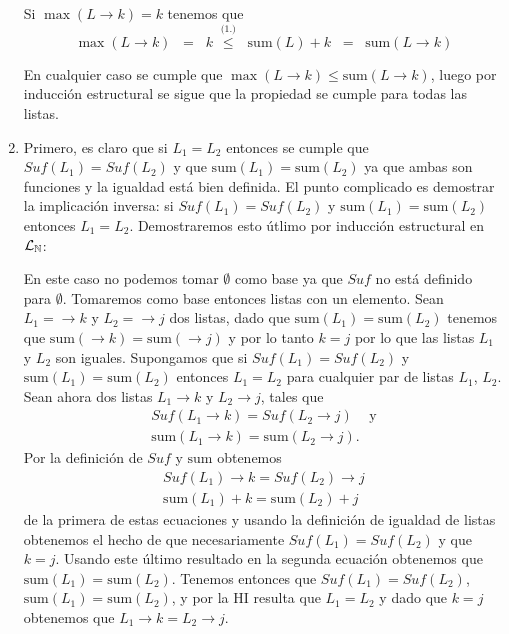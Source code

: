 \begin{teorema}
\begin{demostracion}
\begin{enumerate}
\begin{inducciondemo}
		Si $\max(L\rightarrow k)=k$ tenemos que
		  \[
		  \max(L\rightarrow k)\;\;=\;\;k\;\stackrel{\text{(1.)}}{\leq}\;\;\text{sum}(L) + k\;\;=\;\;\text{sum}(L\rightarrow k)
		  \]
		
		En cualquier caso se cumple que $\max(L\rightarrow k)\leq\text{sum}(L\rightarrow k)$, luego por inducción estructural se sigue que la propiedad se cumple para todas las listas.
	\end{inducciondemo}
	\setcounter{enumi}{3}
	\item Primero, es claro que si $L_1=L_2$ entonces se cumple que $Suf(L_1)=Suf(L_2)$ y que $\text{sum}(L_1)=\text{sum}(L_2)$ ya que ambas son funciones y la igualdad está bien definida.
	El punto complicado es demostrar la implicación inversa: si $Suf(L_1)=Suf(L_2)$ y $\text{sum}(L_1)=\text{sum}(L_2)$ entonces $L_1=L_2$.
	Demostraremos esto útlimo por inducción estructural en $\mathcal{L}_{\mathbb{N}}$:
	\begin{inducciondemo}
	  \BI En este caso no podemos tomar $\emptyset$ como base ya que $Suf$ no está definido para $\emptyset$.
	  Tomaremos como base entonces listas con un elemento.
	  Sean $L_1=\rightarrow k$ y $L_2=\rightarrow j$ dos listas, dado que $\text{sum}(L_1)=\text{sum}(L_2)$ tenemos que $\text{sum}(\rightarrow k)=\text{sum}(\rightarrow j)$ y por lo tanto $k=j$ por lo que las listas $L_1$ y $L_2$ son iguales.
	  \HI Supongamos que si $Suf(L_1)=Suf(L_2)$ y $\text{sum}(L_1)=\text{sum}(L_2)$ entonces $L_1=L_2$ para cualquier par de listas $L_1$, $L_2$.
	  \TI Sean ahora dos listas $L_1\rightarrow k$ y $L_2\rightarrow j$, tales que
	  \[
	  \begin{array}{l}
	  Suf(L_1\rightarrow k)=Suf(L_2\rightarrow j) \;\;\;\text{ y} \\
	  \text{sum}(L_1\rightarrow k)=\text{sum}(L_2\rightarrow j)\text{.}
	  \end{array}
	  \]
	  Por la definición de $Suf$ y $\text{sum}$ obtenemos 
	  \[
	  \begin{array}{l}
	  Suf(L_1)\rightarrow k = Suf(L_2)\rightarrow j \\
	  \text{sum}(L_1)+k=\text{sum}(L_2)+j
	  \end{array}
	  \]
	  de la primera de estas ecuaciones y usando la definición de igualdad de listas obtenemos el hecho de que necesariamente $Suf(L_1)=Suf(L_2)$ y que $k=j$.
	  Usando este último resultado en la segunda ecuación obtenemos que $\text{sum}(L_1)=\text{sum}(L_2)$.
	  Tenemos entonces que $Suf(L_1)=Suf(L_2)$, $\text{sum}(L_1)=\text{sum}(L_2)$, y por la HI resulta que $L_1=L_2$ y dado que $k=j$ obtenemos que $L_1\rightarrow k=L_2\rightarrow j$.
	\end{inducciondemo}
\end{enumerate}
\end{demostracion}
\end{teorema}

